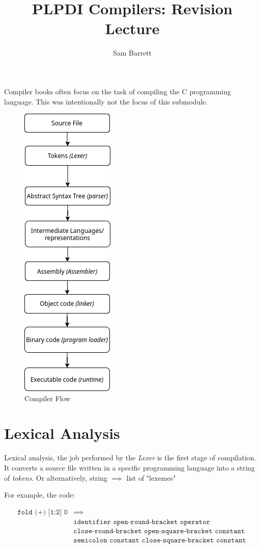 \documentclass{article}
\title{PLPDI Compilers: Revision Lecture}
\author{Sam Barrett}
\renewcommand{\i}[1]{\textit{#1}}
\begin{document}
\maketitle

Compiler books often focus on the task of compiling the C programming language. This was intentionally not the focus of this submodule.

\begin{figure}[htpb]
    \centering
    \includegraphics[width=0.25\linewidth]{CompilerFlow.png}
    \caption{Compiler Flow}%
    \label{fig:compFlow}
\end{figure}
\section{Lexical Analysis}

Lexical analysis, the job performed by the \textit{Lexer} is the first stage of compilation. It converts a source file written in a specific programming language into a string of \i{tokens}. Or alternatively, string $\implies$ list of "lexemes"

For example, the code:


\begin{align*}
    \texttt{fold (+) [1;2] 0} &\implies \\ 
                              &\texttt{identifier open-round-bracket operator } \\ 
                              &\texttt{close-round-bracket open-square-bracket constant } \\ &\texttt{semicolon constant close-square-bracket constant}
\end{align*}
\end{document}

